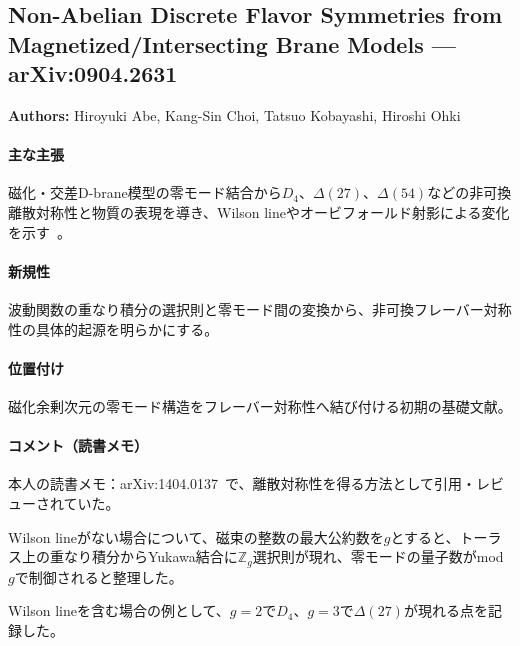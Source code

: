 \subsection{Non-Abelian Discrete Flavor Symmetries from Magnetized/Intersecting Brane Models --- arXiv:0904.2631}

\textbf{Authors:} Hiroyuki Abe, Kang-Sin Choi, Tatsuo Kobayashi, Hiroshi Ohki

\paragraph{主な主張}
磁化・交差D-brane模型の零モード結合から$D_4$、$\Delta(27)$、$\Delta(54)$などの非可換離散対称性と物質の表現を導き、Wilson lineやオービフォールド射影による変化を示す~\cite{Abe:2009vi}。

\paragraph{新規性}
波動関数の重なり積分の選択則と零モード間の変換から、非可換フレーバー対称性の具体的起源を明らかにする。

\paragraph{位置付け}
磁化余剰次元の零モード構造をフレーバー対称性へ結び付ける初期の基礎文献。

\paragraph{コメント（読書メモ）}
本人の読書メモ：arXiv:1404.0137~\cite{Abe:2014nla}で、離散対称性を得る方法として引用・レビューされていた。

Wilson lineがない場合について、磁束の整数の最大公約数を$g$とすると、トーラス上の重なり積分からYukawa結合に$\mathbb{Z}_g$選択則が現れ、零モードの量子数がmod $g$で制御されると整理した。

Wilson lineを含む場合の例として、$g=2$で$D_4$、$g=3$で$\Delta(27)$が現れる点を記録した。
